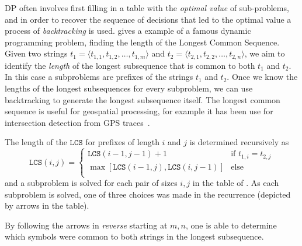 \ac{DP} often involves first filling in a table with the \textit{optimal value} of sub-problems, and
in order to recover the sequence of decisions that led to the optimal value a process of \textit{backtracking} is used. 
 gives a example of a famous dynamic programming problem, finding the length of the Longest Common Sequence. 
Given two strings $t_1=\langle t_{1,1}, t_{1,2}, \dots, t_{1,m}\rangle$
and $t_2=\langle t_{2,1}, t_{2,2}, \dots, t_{2,n}\rangle$, we aim to identify 
the \textit{length} of the longest subsequence that is common to both $t_1$ and $t_2$.
In this case a subproblems are prefixes of the strings $t_1$ and $t_2$.
Once we know the lengths of the longest subsequences for every subproblem, we can use 
backtracking to generate the longest subsequence itself. 
The longest common sequence is useful for geospatial processing, for example it has been use for intersection detection from GPS
traces~\cite{Xie2017DetectingRI}.

The length of the $\mathtt{LCS}$ for prefixes of length $i$ and $j$ is determined recursively as
$$
\mathtt{LCS}(i, j) = \begin{cases}
\mathtt{LCS}(i - 1, j - 1) + 1 & \text{if $t_{1, i} = t_{2,j}$}\\
\max\left[
\mathtt{LCS}(i-1, j),
\mathtt{LCS}(i, j-1)
\right] 
& \text{else}\\
\end{cases}
$$
and a subproblem is solved for each pair of sizes $i,j$ in the table of .
As each subproblem is solved, one of three choices was made in the recurrence (depicted by arrows in the table). 

By following the arrows in \textit{reverse} starting at $m,n$, one is able to determine which
 symbols were common to both strings in the longest subsequence. 


